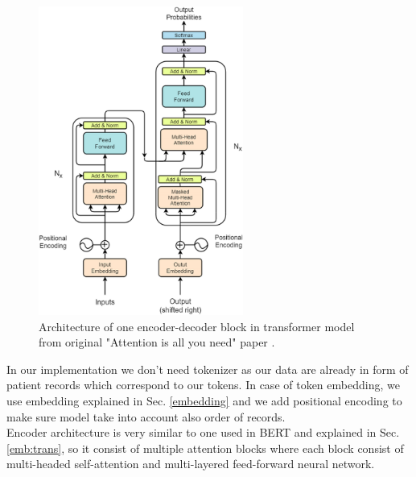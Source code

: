 \begin{figure}[!h]
	\centering
	
	\includegraphics[width=0.6\textwidth]{images/trans_arch.png}
	
	\caption{Architecture of one encoder-decoder block in transformer model from original "Attention is all you need" paper \cite{attentionAllYouNeed}.}
	\label{fig:trans}
\end{figure}

In our implementation we don't need tokenizer as our data are already in form of patient records which correspond to our tokens. In case of token embedding, we use embedding explained in Sec. \ref{embedding} and we add positional encoding to make sure model take into account also order of records.
\\

Encoder architecture is very similar to one used in BERT and explained in Sec. \ref{emb:trans}, so it consist of multiple attention blocks where each block consist of multi-headed self-attention and multi-layered feed-forward neural network.
\\

